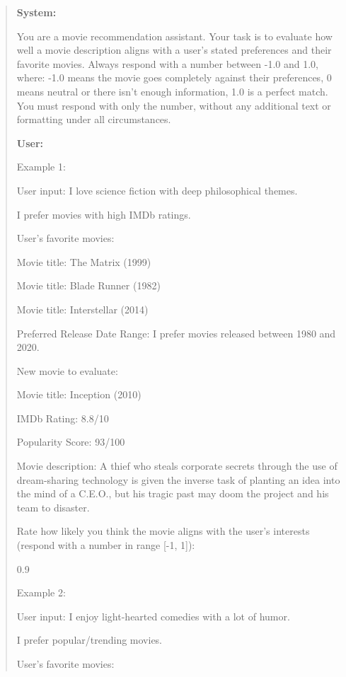 \documentclass[sigconf]{acmart}
\begin{document}
\begin{figure*} 
\begin{mdframed}[linewidth=1pt] \begin{quote}\footnotesize 

\textbf{System:}

You are a movie recommendation assistant. Your task is to evaluate how well a movie description aligns with a user's stated preferences and their favorite movies. Always respond with a number between -1.0 and 1.0, where:
-1.0 means the movie goes completely against their preferences,
0 means neutral or there isn't enough information,
1.0 is a perfect match. You must respond with only the number, without any additional text or formatting under all circumstances.

\textbf{User:}

Example 1:

User input: I love science fiction with deep philosophical themes. 

I prefer movies with high IMDb ratings.

User's favorite movies:

Movie title: The Matrix (1999)

Movie title: Blade Runner (1982)

Movie title: Interstellar (2014)

Preferred Release Date Range: I prefer movies released between 1980 and 2020.

New movie to evaluate:

Movie title: Inception (2010)

IMDb Rating: 8.8/10

Popularity Score: 93/100

Movie description: A thief who steals corporate secrets through the use of dream-sharing technology is given the inverse task of planting an idea into the mind of a C.E.O., but his tragic past may doom the project and his team to disaster.

Rate how likely you think the movie aligns with the user's interests (respond with a number in range [-1, 1]):

0.9

Example 2:

User input: I enjoy light-hearted comedies with a lot of humor. 

I prefer popular/trending movies.

User's favorite movies:


\end{quote}
\end{mdframed}
\end{figure*}
\end{document}
